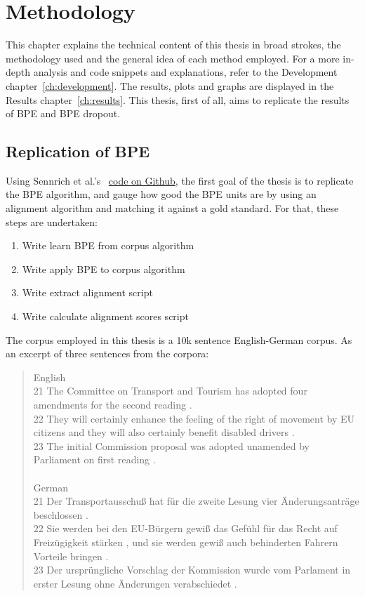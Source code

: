 %
%

\chapter{Methodology}\label{ch:methodology}

This chapter explains the technical content of this thesis in broad strokes, the methodology used and the general idea of each method employed. For a more in-depth analysis and code snippets and explanations, refer to the Development chapter~\ref{ch:development}. The results, plots and graphs are displayed in the Results chapter~\ref{ch:results}. This thesis, first of all, aims to replicate the results of BPE and BPE dropout.

\section{Replication of BPE}

Using Sennrich et al.'s~\cite{sennrich2015neural} \href{https://github.com/rsennrich/subword-nmt/}{code on Github}, the first goal of the thesis is to replicate the BPE algorithm, and gauge how good the BPE units are by using an alignment algorithm and matching it against a gold standard. For that, these steps are undertaken:

\begin{enumerate}
	\item Write learn BPE from corpus algorithm
	\item Write apply BPE to corpus algorithm
	\item Write extract alignment script
	\item Write calculate alignment scores script
\end{enumerate}

The corpus employed in this thesis is a 10k sentence English-German corpus. As an excerpt of three sentences from the corpora:

\begin{quote}
	English\\
	21	The Committee on Transport and Tourism has adopted four amendments for the second reading .\\
	22	They will certainly enhance the feeling of the right of movement by EU citizens and they will also certainly benefit disabled drivers .\\
	23	The initial Commission proposal was adopted unamended by Parliament on first reading .\\\\
	German\\
	21	Der Transportausschuß hat für die zweite Lesung vier Änderungsanträge beschlossen .\\
	22	Sie werden bei den EU-Bürgern gewiß das Gefühl für das Recht auf Freizügigkeit stärken , und sie werden gewiß auch behinderten Fahrern Vorteile bringen .\\
	23	Der ursprüngliche Vorschlag der Kommission wurde vom Parlament in erster Lesung ohne Änderungen verabschiedet .
\end{quote}

